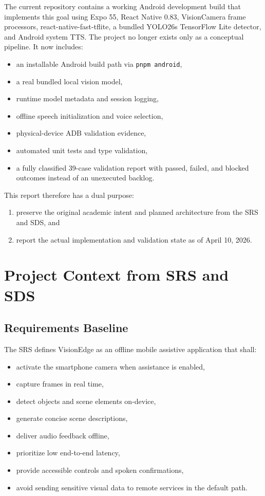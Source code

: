 \documentclass[conference]{IEEEtran}
\newcommand{\reportdate}{April 10, 2026}
\begin{document}
The current repository contains a working Android development build that implements this goal using Expo 55, React Native 0.83, VisionCamera frame processors, react-native-fast-tflite, a bundled YOLO26s TensorFlow Lite detector, and Android system TTS. The project no longer exists only as a conceptual pipeline. It now includes:
\begin{itemize}[leftmargin=1.2em]
\item an installable Android build path via \texttt{pnpm android},
\item a real bundled local vision model,
\item runtime model metadata and session logging,
\item offline speech initialization and voice selection,
\item physical-device ADB validation evidence,
\item automated unit tests and type validation,
\item a fully classified 39-case validation report with passed, failed, and blocked outcomes instead of an unexecuted backlog.
\end{itemize}

This report therefore has a dual purpose:
\begin{enumerate}[leftmargin=1.2em]
\item preserve the original academic intent and planned architecture from the SRS and SDS, and
\item report the actual implementation and validation state as of \reportdate.
\end{enumerate}

\section{Project Context from SRS and SDS}
\subsection{Requirements Baseline}
The SRS defines VisionEdge as an offline mobile assistive application that shall:
\begin{itemize}[leftmargin=1.2em]
\item activate the smartphone camera when assistance is enabled,
\item capture frames in real time,
\item detect objects and scene elements on-device,
\item generate concise scene descriptions,
\item deliver audio feedback offline,
\item prioritize low end-to-end latency,
\item provide accessible controls and spoken confirmations,
\item avoid sending sensitive visual data to remote services in the default path.
\end{itemize}
\end{document}

